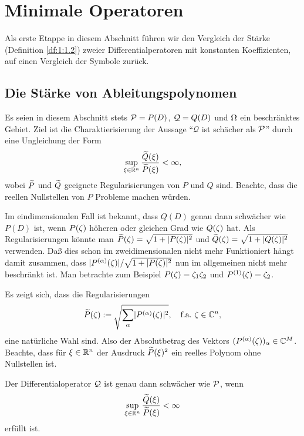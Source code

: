 \chapter{Minimale Operatoren}

Als erste Etappe in diesem Abschnitt führen wir den Vergleich der Stärke (Definition \ref{df:1:1.2})
zweier Differentialperatoren mit konstanten Koeffizienten,
auf einen Vergleich der Symbole zurück.

\section{Die Stärke von Ableitungspolynomen}

Es seien in diesem Abschnitt stets $\mathcal P=P(D)$, $\mathcal Q=Q(D)$ und $\Omega$ ein beschränktes Gebiet.
Ziel ist die Charaktierisierung der Aussage ``$\mathcal Q$ ist schächer als $\mathcal P$''
durch eine Ungleichung der Form
\begin{equation}\label{eq:2:1}
\sup_{\xi\in\mathbb R^n}\frac{\widetilde{Q}(\xi)}{\widetilde{P}(\xi)}<\infty,
\end{equation}
wobei $\widetilde{P}$ und $\widetilde{Q}$ geeignete Regularisierungen von $P$ und $Q$ sind.
Beachte, dass die reellen Nullstellen von $P$ Probleme machen würden.

Im eindimensionalen Fall ist bekannt, dass $Q(D)$ genau dann schwächer wie $P(D)$ ist,
wenn $P(\zeta)$ höheren oder gleichen Grad wie $Q(\zeta)$ hat.
Als Regularisierungen könnte man $\widetilde{P}(\zeta)=\sqrt{1+\lvert P(\zeta)\rvert^2}$
und $\widetilde{Q}(\zeta)=\sqrt{1+\lvert Q(\zeta)\rvert^2}$ verwenden.
Daß dies schon im zweidimensionalen nicht mehr Funktioniert
hängt damit zusammen, dass $\lvert P^{(\alpha)}(\zeta)\rvert/\sqrt{1+\lvert P(\zeta)\rvert^2}$
nun im allgemeinen nicht mehr beschränkt ist.
Man betrachte zum Beispiel $P(\zeta)=\zeta_1\zeta_2$ und $P^{(1)}(\zeta)=\zeta_2$.

Es zeigt sich, dass die Regularisierungen
\begin{equation}\label{eq:2:2}
\widetilde{P}(\zeta):=\sqrt{\sum_\alpha\lvert P^{(\alpha)}(\zeta)\rvert^2},
\quad\text{f.a.}~\zeta\in\mathbb C^n,
\end{equation}
eine natürliche Wahl sind.
Also der Absolutbetrag des Vektors $(P^{(\alpha)}(\zeta))_\alpha\in\mathbb C^M$.
Beachte, dass für $\xi\in\mathbb R^n$ der Ausdruck
$\widetilde{P}(\xi)^2$ ein reelles Polynom ohne Nullstellen ist.

\begin{thm}\label{thm:2:2.1}
Der Differentialoperator $\mathcal Q$ ist genau dann schwächer wie $\mathcal P$,
wenn
\begin{equation}\label{eq:thm:2:2.1}
\sup_{\xi\in\mathbb R^n}\frac{\widetilde{Q}(\xi)}{\widetilde{P}(\xi)}<\infty
\end{equation}
erfüllt ist.
\end{thm}

